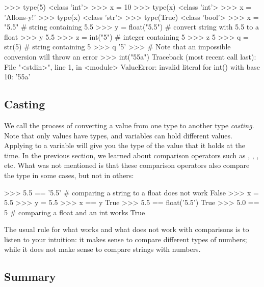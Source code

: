 \documentclass[11pt]{cselabheader}
\begin{document}
\begin{pyconcode}
>>> type(5)
<class 'int'>
>>> x = 10
>>> type(x)
<class 'int'>
>>> x = 'Allons-y!'
>>> type(x)
<class 'str'>
>>> type(True)
<class 'bool'>
>>> x = "5.5" # string containing 5.5
>>> y = float("5.5") # convert string with 5.5 to a float
>>> y
5.5
>>> z = int("5") # integer containing 5
>>> z
5
>>> q = str(5) # string containing 5
>>> q
'5'
>>> # Note that an impossible conversion will throw an error
>>> int("55a")
Traceback (most recent call last):
  File "<stdin>", line 1, in <module>
ValueError: invalid literal for int() with base 10: '55a'
\end{pyconcode}

\subsection{Casting}
We call the process of converting a value from one type to another type
\emph{casting}. Note that only values have types, and variables can hold
different values.  Applying  to a variable will give you
the type of the value that it holds at the time. In the previous section, we
learned about comparison operators such as \pythoninline{!=}, \pythoninline{<},
\pythoninline{>}, etc. What was not mentioned is that these comparison operators
also compare the type in some cases, but not in others:
\begin{pyconcode}
>>> 5.5 == '5.5' # comparing a string to a float does not work
False
>>> x = 5.5
>>> y = 5.5
>>> x == y
True
>>> 5.5 == float('5.5')
True
>>> 5.0 == 5 # comparing a float and an int works
True
\end{pyconcode}

The usual rule for what works and what does not work with comparisons is to
listen to your intuition: it makes sense to compare different types of numbers;
while it does not make sense to compare strings with numbers.

\subsection{Summary}
\end{document}
